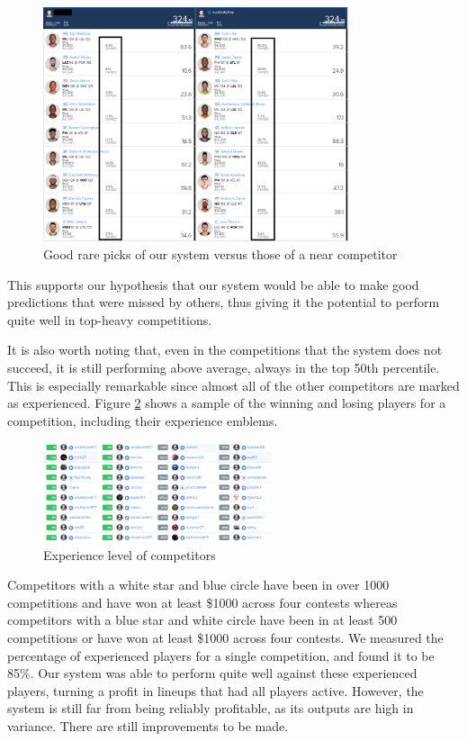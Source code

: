 \begin{figure}[ht]
    \centering
    \includegraphics[width=0.8\textwidth]{figures/mevsbest}
    \caption{Good rare picks of our system versus those of a near competitor}
    \label{fig:win_record}
\end{figure}

This supports our hypothesis that our system would be able to make good predictions that were missed by others, thus giving it the potential to perform quite well in top-heavy competitions.

It is also worth noting that, even in the competitions that the system does not succeed, it is still performing above average, always in the top 50th percentile. This is especially remarkable since almost all of the other competitors are marked as experienced. Figure \ref{fig:competitors} shows a sample of the winning and losing players for a competition, including their experience emblems.
\begin{figure}[ht]
    \centering
    \includegraphics[width=0.6\textwidth]{figures/competitors}
    \caption{Experience level of competitors}
    \label{fig:competitors}
\end{figure}
Competitors with a white star and blue circle have been in over 1000 competitions and have won at least \$1000 across four contests whereas competitors with a blue star and white circle have been in at least 500 competitions or have won at least \$1000 across four contests. We measured the percentage of experienced players for a single competition, and found it to be 85\%. Our system was able to perform quite well against these experienced players, turning a profit in lineups that had all players active. However, the system is still far from being reliably profitable, as its outputs are high in variance. There are still improvements to be made.

